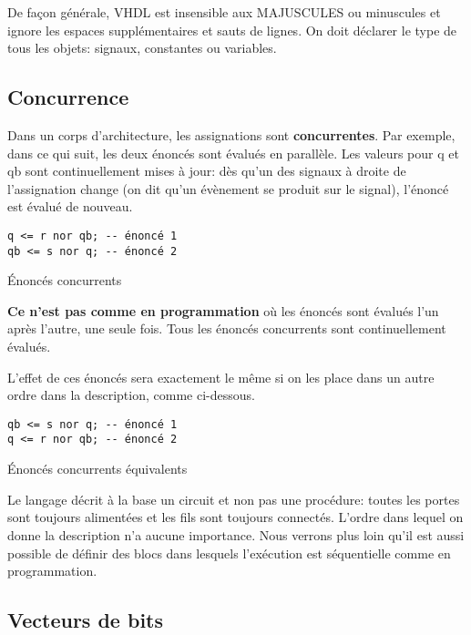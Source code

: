 \documentclass[11pt]{article}
\begin{document}
De façon générale, VHDL est insensible aux MAJUSCULES ou minuscules
et ignore les espaces supplémentaires et sauts de lignes. On doit
déclarer le type de tous les objets: signaux, constantes ou variables.

\subsection{Concurrence}
\label{sec:org703b2d9}

Dans un corps d'architecture, les assignations sont
\textbf{concurrentes}. Par exemple, dans ce qui suit, les deux énoncés sont
évalués en parallèle. Les valeurs pour q et qb sont continuellement
mises à jour: dès qu'un des signaux à droite de l'assignation change
(on dit qu'un évènement se produit sur le signal), l'énoncé est évalué
de nouveau.

\begin{listing}[htbp]
\begin{verbatim}
q <= r nor qb; -- énoncé 1
qb <= s nor q; -- énoncé 2
\end{verbatim}
\caption{Énoncés concurrents}
\end{listing}

\textbf{Ce n'est pas comme en programmation} où les énoncés sont évalués
l'un après l'autre, une seule fois. Tous les énoncés concurrents sont
continuellement évalués.

L'effet de ces énoncés sera exactement le même si on les place dans un
autre ordre dans la description, comme ci-dessous.

\begin{listing}[htbp]
\begin{verbatim}
qb <= s nor q; -- énoncé 1
q <= r nor qb; -- énoncé 2
\end{verbatim}
\caption{Énoncés concurrents équivalents}
\end{listing}

Le langage décrit à la base un circuit et non pas une procédure:
toutes les portes sont toujours alimentées et les fils sont toujours
connectés. L'ordre dans lequel on donne la description n'a aucune
importance. Nous verrons plus loin qu'il est aussi possible de définir
des blocs dans lesquels l'exécution est séquentielle comme en
programmation.

\subsection{Vecteurs de bits}
\label{sec:orgbc81767}
\end{document}
